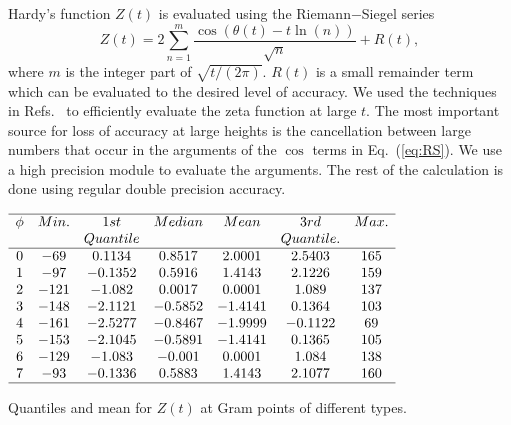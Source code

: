 \documentclass[twoside]{article}
\theoremstyle{definition}
\begin{document}
Hardy's function $Z(t)$  is evaluated using the Riemann$-$Siegel series
\begin{equation}
Z(t) = 2\sum^{m}_{n=1}\frac{\cos(\theta(t) - t \ln (n))}{\sqrt{n}} + R(t), 
\label{eq:RS}
\end{equation}
where $m$ is the integer part of $\sqrt{t/(2\pi)}$. $R(t)$ is a small remainder
term which can be evaluated to the desired level of accuracy. We used the techniques in Refs.~\cite{Odlyzko 1992,hiary,gourdon} 
to efficiently evaluate the zeta function at large $t$. The most important 
source for loss of accuracy at large heights is the cancellation between
large numbers that occur in the arguments of the $\cos$ terms in Eq.~(\ref{eq:RS}). We 
use a high precision module to evaluate the arguments. The rest of the calculation
is done using regular double precision accuracy. 

\begin{table}
\centering \(\begin{array}{ccccccc}
\hline
 \phi &     Min.   & 1st    &  Median    &   Mean   & 3rd    &   Max. \\
 &              & Quantile   &            &              & Quantile.    &   \\
\hline
0 &-69 &0.1134 &0.8517 &2.0001 &2.5403 &165  \\
1 &-97 &-0.1352 &0.5916 &1.4143 &2.1226 &159 \\
2 &-121 &-1.082 &0.0017 &0.0001 &1.089 &137 \\
3 &-148 &-2.1121 &-0.5852 &-1.4141 &0.1364 &103 \\
4 &-161 &-2.5277 &-0.8467 &-1.9999 &-0.1122 &69 \\
5 &-153 &-2.1045 &-0.5891 &-1.4141 &0.1365 &105 \\
6 &-129 &-1.083 &-0.001 &0.0001 &1.084 &138 \\
7 &-93 &-0.1336 &0.5883 &1.4143 &2.1077 &160 \\
\hline
\end{array}\)
\caption{Quantiles and mean for  $Z(t)$ at Gram points of different types.} 
\label{tab:quantiles}
\end{table}
\end{document}
